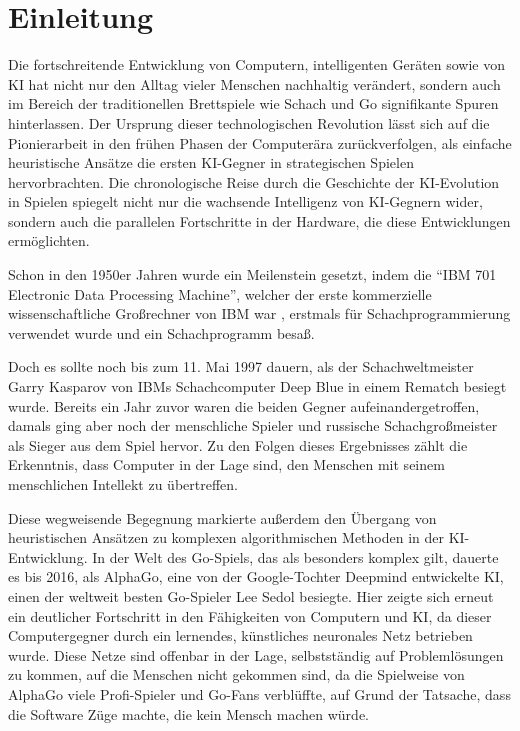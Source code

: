 \chapter{Einleitung}
\label{chapter:einleitung}

Die fortschreitende Entwicklung von Computern, intelligenten Geräten sowie von \ac{KI} hat nicht nur den Alltag vieler Menschen nachhaltig verändert, sondern auch im Bereich der traditionellen Brettspiele wie Schach und Go signifikante Spuren hinterlassen. Der Ursprung dieser technologischen Revolution lässt sich auf die Pionierarbeit in den frühen Phasen der Computerära zurückverfolgen, als einfache heuristische Ansätze die ersten \ac{KI}-Gegner in strategischen Spielen hervorbrachten. Die chronologische Reise durch die Geschichte der \ac{KI}-Evolution in Spielen spiegelt nicht nur die wachsende Intelligenz von \ac{KI}-Gegnern wider, sondern auch die parallelen Fortschritte in der Hardware, die diese Entwicklungen ermöglichten.

Schon in den 1950er Jahren wurde ein Meilenstein gesetzt, indem die \enquote{\acs{IBM} 701 Electronic Data Processing Machine}, welcher der erste kommerzielle wissenschaftliche Großrechner von \ac{IBM} war \cite{2023.IBM701}, erstmals für Schachprogrammierung verwendet wurde und ein Schachprogramm besaß. \cite{2014.EndeDerBescheidenheit}

Doch es sollte noch bis zum 11. Mai 1997 dauern, als der Schachweltmeister Garry Kasparov von \ac{IBM}s Schachcomputer Deep Blue in einem Rematch besiegt wurde. Bereits ein Jahr zuvor waren die beiden Gegner aufeinandergetroffen, damals ging aber noch der menschliche Spieler und russische Schachgroßmeister als Sieger aus dem Spiel hervor. Zu den Folgen dieses Ergebnisses zählt die Erkenntnis, dass Computer in der Lage sind, den Menschen mit seinem menschlichen Intellekt zu übertreffen. \cite{2022.DeepBlue}

Diese wegweisende Begegnung markierte außerdem den Übergang von heuristischen Ansätzen zu komplexen algorithmischen Methoden in der \ac{KI}-Entwicklung. In der Welt des Go-Spiels, das als besonders komplex gilt, dauerte es bis 2016, als AlphaGo, eine von der Google-Tochter Deepmind entwickelte \ac{KI}, einen der weltweit besten Go-Spieler Lee Sedol besiegte. Hier zeigte sich erneut ein deutlicher Fortschritt in den Fähigkeiten von Computern und \ac{KI}, da dieser Computergegner durch ein lernendes, künstliches neuronales Netz betrieben wurde. Diese Netze sind offenbar in der Lage, selbstständig auf Problemlösungen zu kommen, auf die Menschen nicht gekommen sind, da die Spielweise von AlphaGo viele Profi-Spieler und Go-Fans verblüffte, auf Grund der Tatsache, dass die Software Züge machte, die kein Mensch machen würde. \cite{2016.AlphaGo}

